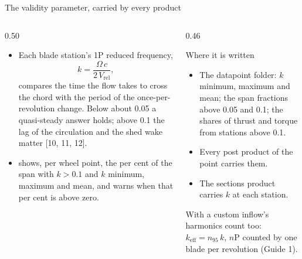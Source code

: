 \begin{frame}{The validity parameter, carried by every product}
\begin{columns}[T]
\begin{column}{0.50\textwidth}
\begin{itemize}\small
  \item Each blade station's 1P reduced frequency,
        \[ k = \frac{\Omega\,c}{2\,V_\mathrm{rel}}, \]
        compares the time the flow takes to cross the chord with the period of
        the once-per-revolution change. Below about 0.05 a quasi-steady
        answer holds; above 0.1 the lag of the circulation and the shed wake
        matter [10, 11, 12].
  \item {} shows, per wheel point, the per cent of the span with
        \(k > 0.1\) and \(k\) minimum, maximum and mean, and warns when that
        per cent is above zero.
\end{itemize}
\end{column}
\begin{column}{0.46\textwidth}
\begin{block}{Where it is written}
\small
\begin{itemize}\small
  \item The datapoint folder: \(k\) minimum, maximum and mean; the span
        fractions above 0.05 and 0.1; the shares of thrust and torque from
        stations above 0.1.
  \item Every post product of the point carries them.
  \item The sections product carries \(k\) at each station.
\end{itemize}
\end{block}
{\scriptsize With  a custom inflow's harmonics count too:
\(k_\mathrm{eff} = n_{95}\,k\), \(n\)P counted by one blade per revolution
(Guide 1).\par}
\end{column}
\end{columns}
\end{frame}
